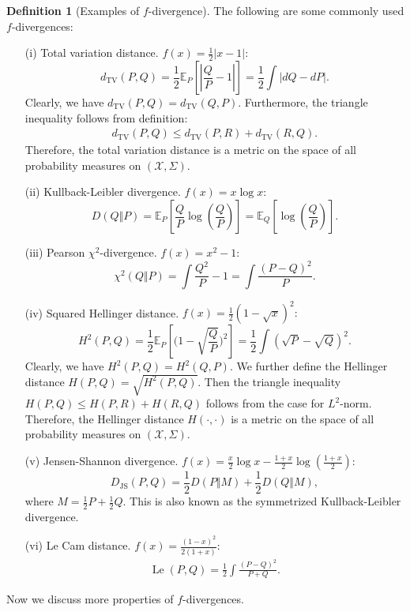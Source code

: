 \documentclass{article}
\numberwithin{equation}{section}
\newcommand{\E}{\mathbb{E}}
\renewcommand{\cal}{\mathcal}
\DeclareMathOperator{\Le}{Le}
\theoremstyle{plain}
\theoremstyle{definition}
\newtheorem{definition}[theorem]{Definition}
\begin{document}
\begin{definition}[Examples of $f$-divergence]\label{fdivex}
The following are some commonly used $f$-divergences:
\begin{itemize}
	\item[(i)] Total variation distance. $f(x)=\frac{1}{2}\vert x-1\vert:$
	\begin{equation*}
		d_{\mathrm{TV}}(P,Q) = \frac{1}{2}\E_P\left[\left\vert\frac{Q}{P} - 1\right\vert\right] = \frac{1}{2}\int\vert dQ - dP\vert.\label{eq:3.4}
	\end{equation*}
	Clearly, we have $d_\mathrm{TV}(P,Q) = d_\mathrm{TV}(Q,P)$. Furthermore, the triangle inequality follows from definition:
	\begin{align*}
		d_\mathrm{TV}(P,Q)\leq d_\mathrm{TV}(P,R)+d_\mathrm{TV}(R,Q).
	\end{align*} 
Therefore, the total variation distance is a metric on the space of all probability measures on $(\cal{X},\Sigma)$.
	\item[(ii)] Kullback-Leibler divergence. $f(x) = x\log x:$
	\begin{equation*}
		D(Q\Vert P) = \E_P\left[\frac{Q}{P}\log\left(\frac{Q}{P}\right)\right]=\E_Q\left[\log\left(\frac{Q}{P}\right)\right]. \label{eq:3.5}
	\end{equation*}
	\item[(iii)] Pearson $\chi^2$-divergence. $f(x) = x^2-1:$
\begin{equation*}
	\chi^2(Q\Vert P) = \int\frac{Q^2}{P} - 1=\int\frac{(P-Q)^2}{P}. \label{eq:3.7}
\end{equation*}
	\item[(iv)] Squared Hellinger distance.  $f(x) = \frac{1}{2}(1-\sqrt{x})^2:$
	\begin{equation*}
		H^2(P,Q) = \frac{1}{2}\E_P\left[\biggl(1-\sqrt{\frac{Q}{P}}\biggr)^2\right] = \frac{1}{2}\int\left(\sqrt{P} - \sqrt{Q}\right)^2. \label{eq:3.6}
	\end{equation*}
	Clearly, we have $H^2(P,Q) = H^2(Q,P)$. We further define the Hellinger distance $H(P,Q)=\sqrt{H^2(P,Q)}$. Then the triangle inequality $H(P,Q)\leq H(P,R)+H(R,Q)$ follows from the case for $L^2$-norm. Therefore, the Hellinger distance $H(\cdot,\cdot)$ is a metric on the space of all probability measures on $(\cal{X},\Sigma)$.
	\item[(v)] Jensen-Shannon divergence. $f(x) = \frac{x}{2}\log x - \frac{1+x}{2}\log\left(\frac{1+x}{2}\right):$
	\begin{equation*}
		D_{\mathrm{JS}}(P,Q) = \frac{1}{2}D(P\Vert M) + \frac{1}{2}D(Q\Vert M),\label{eq:3.8}
	\end{equation*}
	where $M=\frac{1}{2}P+\frac{1}{2}Q.$ This is also known as the symmetrized Kullback-Leibler divergence.
	\item[(vi)] Le Cam distance. $f(x)=\frac{(1-x)^2}{2(1+x)}:$
	\begin{align*}
		\Le(P,Q)=\frac{1}{2}\int\frac{(P-Q)^2}{P+Q}.
	\end{align*}
\end{itemize}
\end{definition} 
Now we discuss more properties of $f$-divergences.
\end{document}
